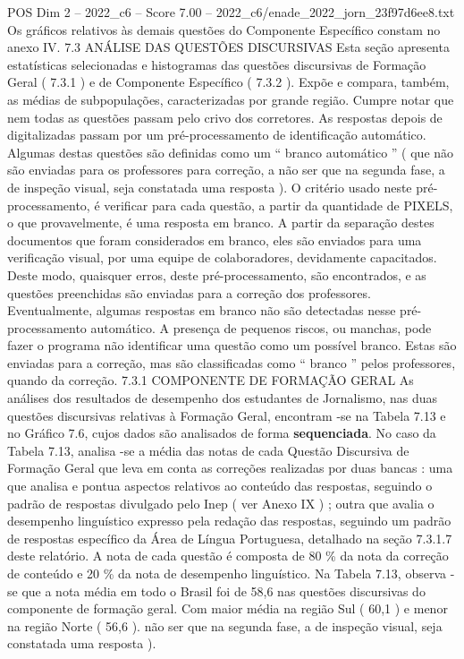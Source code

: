 \begin{textsample}{POS Dim 2 – 2022\_c6 – Score 7.00 – 2022\_c6/enade\_2022\_jorn\_23f97d6ee8.txt}
Os gráficos relativos às demais questões do Componente Específico constam no anexo IV. 7.3 ANÁLISE DAS QUESTÕES DISCURSIVAS Esta seção apresenta estatísticas selecionadas e histogramas das questões discursivas de Formação Geral ( 7.3.1 ) e de Componente Específico ( 7.3.2 ).
Expõe e compara, também, as médias de subpopulações, caracterizadas por grande região.
Cumpre notar que nem todas as questões passam pelo crivo dos corretores.
As respostas depois de digitalizadas passam por um pré-processamento de identificação automático.
Algumas destas questões são definidas como um “ branco automático ” ( que não são enviadas para os professores para correção, a não ser que na segunda fase, a de inspeção visual, seja constatada uma resposta ).
O critério usado neste pré-processamento, é verificar para cada questão, a partir da quantidade de PIXELS, o que provavelmente, é uma resposta em branco.
A partir da separação destes documentos que foram considerados em branco, eles são enviados para uma verificação visual, por uma equipe de colaboradores, devidamente capacitados.
Deste modo, quaisquer erros, deste pré-processamento, são encontrados, e as questões preenchidas são enviadas para a correção dos professores.
Eventualmente, algumas respostas em branco não são detectadas nesse pré-processamento automático.
A presença de pequenos riscos, ou manchas, pode fazer o programa não identificar uma questão como um possível branco.
Estas são enviadas para a correção, mas são classificadas como “ branco ” pelos professores, quando da correção. 7.3.1 COMPONENTE DE FORMAÇÃO GERAL As análises dos resultados de desempenho dos estudantes de Jornalismo, nas duas questões discursivas relativas à Formação Geral, encontram -se na Tabela 7.13 e no Gráfico 7.6, cujos dados são analisados de forma \textbf{sequenciada}.
No caso da Tabela 7.13, analisa -se a média das notas de cada Questão Discursiva de Formação Geral que leva em conta as correções realizadas por duas bancas : uma que analisa e pontua aspectos relativos ao conteúdo das respostas, seguindo o padrão de respostas divulgado pelo Inep ( ver Anexo IX ) ; outra que avalia o desempenho linguístico expresso pela redação das respostas, seguindo um padrão de respostas específico da Área de Língua Portuguesa, detalhado na seção 7.3.1.7 deste relatório.
A nota de cada questão é composta de 80 \% da nota da correção de conteúdo e 20 \% da nota de desempenho linguístico.
Na Tabela 7.13, observa -se que a nota média em todo o Brasil foi de 58,6 nas questões discursivas do componente de formação geral.
Com maior média na região Sul ( 60,1 ) e menor na região Norte ( 56,6 ). não ser que na segunda fase, a de inspeção visual, seja constatada uma resposta ).

\end{textsample}
